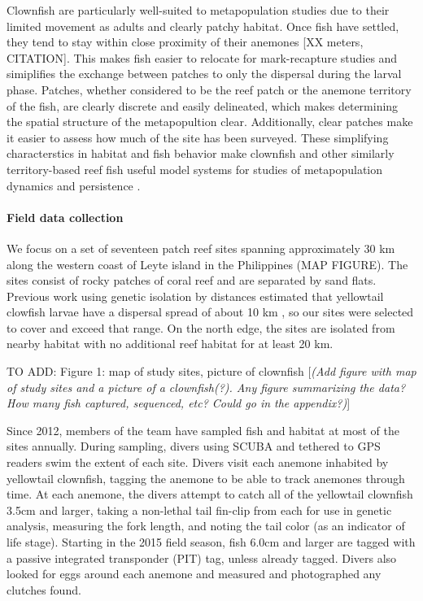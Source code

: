 \documentclass[12pt, oneside]{article}   	%
\begin{document}
Clownfish are particularly well-suited to metapopulation studies due to their limited movement as adults and clearly patchy habitat. Once fish have settled, they tend to stay within close proximity of their anemones [XX meters, CITATION]. This makes fish easier to relocate for mark-recapture studies and simiplifies the exchange between patches to only the dispersal during the larval phase. Patches, whether considered to be the reef patch or the anemone territory of the fish, are clearly discrete and easily delineated, which makes determining the spatial structure of the metapopultion clear. Additionally, clear patches make it easier to assess how much of the site has been surveyed. These simplifying characterstics in habitat and fish behavior make clownfish and other similarly territory-based reef fish useful model systems for studies of metapopulation dynamics and persistence \citep[e.g.][]{buston2013marine, salles_coral_2015, johnson2018integrating}.

\paragraph*{Field data collection}

We focus on a set of seventeen patch reef sites spanning approximately 30 km along the western coast of Leyte island in the Philippines (MAP FIGURE). The sites consist of rocky patches of coral reef and are separated by sand flats. Previous work using genetic isolation by distances estimated that yellowtail clowfish larvae have a dispersal spread of about 10 km \citep[range 4-27 km][]{pinsky2010using}, so our sites were selected to cover and exceed that range. On the north edge, the sites are isolated from nearby habitat with no additional reef habitat for at least 20 km. %

TO ADD: Figure 1: map of study sites, picture of clownfish
[\textit{(Add figure with map of study sites and a picture of a clownfish(?). Any figure summarizing the data? How many fish captured, sequenced, etc? Could go in the appendix?)}]

Since 2012, members of the team have sampled fish and habitat at most of the sites annually. During sampling, divers using SCUBA and tethered to GPS readers swim the extent of each site. Divers visit each anemone inhabited by yellowtail clownfish, tagging the anemone to be able to track anemones through time. At each anemone, the divers attempt to catch all of the yellowtail clownfish 3.5cm and larger, taking a non-lethal tail fin-clip from each for use in genetic analysis, measuring the fork length, and noting the tail color (as an indicator of life stage). Starting in the 2015 field season, fish 6.0cm and larger are tagged with a passive integrated transponder (PIT) tag, unless already tagged. Divers also looked for eggs around each anemone and measured and photographed any clutches found.
\end{document}
